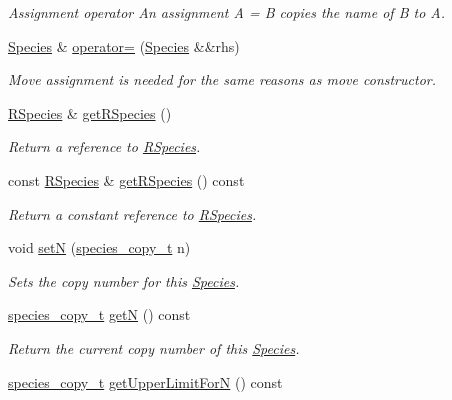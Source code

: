 \begin{DoxyCompactItemize}
\begin{DoxyCompactList}\small\item\em Assignment operator An assignment A = B copies the name of B to A. \end{DoxyCompactList}\item 
\hyperlink{classchem_1_1Species}{Species} \& \hyperlink{classchem_1_1Species_ae9344aa4bcd5fb1a511361bef72162f6}{operator=} (\hyperlink{classchem_1_1Species}{Species} \&\&rhs)
\begin{DoxyCompactList}\small\item\em Move assignment is needed for the same reasons as move constructor. \end{DoxyCompactList}\item 
\hyperlink{classchem_1_1RSpecies}{R\-Species} \& \hyperlink{classchem_1_1Species_a1719a8155a69e9a62593d23d4bfc8514}{get\-R\-Species} ()
\begin{DoxyCompactList}\small\item\em Return a reference to \hyperlink{classchem_1_1RSpecies}{R\-Species}. \end{DoxyCompactList}\item 
const \hyperlink{classchem_1_1RSpecies}{R\-Species} \& \hyperlink{classchem_1_1Species_a438dae186317809effdd040ed38c568b}{get\-R\-Species} () const 
\begin{DoxyCompactList}\small\item\em Return a constant reference to \hyperlink{classchem_1_1RSpecies}{R\-Species}. \end{DoxyCompactList}\item 
void \hyperlink{classchem_1_1Species_af10a33a212fdb986fb93613e9c219f7a}{set\-N} (\hyperlink{common_8h_a3503f321fd36304ee274141275cca586}{species\-\_\-copy\-\_\-t} n)
\begin{DoxyCompactList}\small\item\em Sets the copy number for this \hyperlink{classchem_1_1Species}{Species}. \end{DoxyCompactList}\item 
\hyperlink{common_8h_a3503f321fd36304ee274141275cca586}{species\-\_\-copy\-\_\-t} \hyperlink{classchem_1_1Species_af7c9f51060b84169b428a7796dad6dca}{get\-N} () const 
\begin{DoxyCompactList}\small\item\em Return the current copy number of this \hyperlink{classchem_1_1Species}{Species}. \end{DoxyCompactList}\item 
\hyperlink{common_8h_a3503f321fd36304ee274141275cca586}{species\-\_\-copy\-\_\-t} \hyperlink{classchem_1_1Species_a05fbe0a05f028beb1bb729f19d44a56a}{get\-Upper\-Limit\-For\-N} () const 

\end{DoxyCompactItemize}
